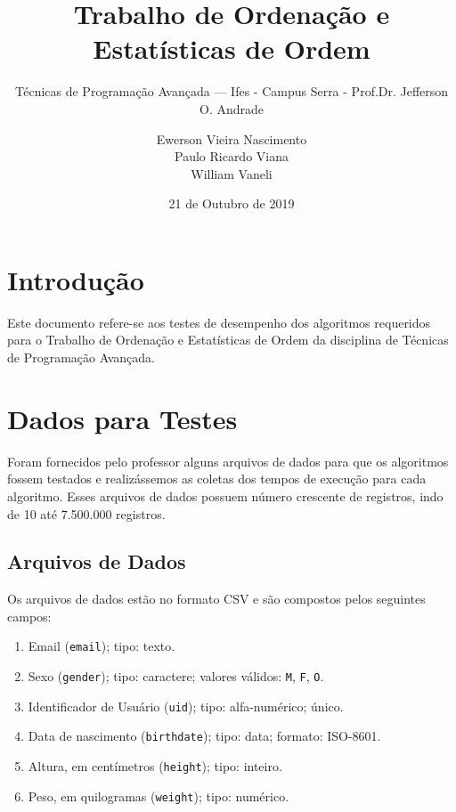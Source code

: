 \documentclass[a4paper,12pt]{scrartcl}
\title{Trabalho de Ordenação e Estatísticas de Ordem}
\subtitle{Técnicas de Programação Avançada — Ifes -  Campus Serra - Prof.Dr. Jefferson O. Andrade}
\author{Ewerson Vieira Nascimento\\ Paulo Ricardo Viana \\ William Vaneli  }
\date{21 de Outubro de 2019}
\begin{document}
\maketitle
\tableofcontents
\section{Introdução}

Este  documento refere-se aos testes de desempenho dos algoritmos requeridos para o Trabalho de Ordenação e Estatísticas de Ordem da disciplina de Técnicas de Programação Avançada.

\section{Dados para Testes}

Foram fornecidos pelo professor alguns arquivos de dados para que os algoritmos fossem testados e realizássemos as coletas dos tempos de execução para cada algoritmo. Esses arquivos de dados possuem número crescente de registros, indo de 10 até 7.500.000 registros.


\subsection{Arquivos de Dados}

Os arquivos de dados estão no formato CSV e são compostos pelos seguintes
campos:

\begin{enumerate}
\item Email (\texttt{email}); tipo: texto.
\item Sexo (\texttt{gender}); tipo: caractere; valores válidos: \texttt{M},
  \texttt{F}, \texttt{O}.
\item Identificador de Usuário (\texttt{uid}); tipo: alfa-numérico; único.
\item Data de nascimento (\texttt{birthdate}); tipo: data; formato: ISO-8601.
\item Altura, em centímetros (\texttt{height}); tipo: inteiro.
\item Peso, em quilogramas (\texttt{weight}); tipo: numérico.
\end{enumerate}
\end{document}
